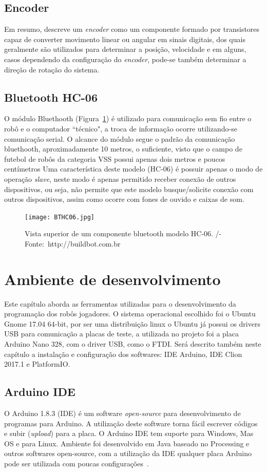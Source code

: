 \documentclass[a4paper,12pt,portuguese]{ufms-cpcx}
\begin{document}
\section{Encoder}\label{encoder}
Em resumo,  descreve um \textit{encoder} como um componente formado por transistores capaz de converter movimento linear ou angular em sinais digitais, dos quais geralmente são utilizados para determinar a posição, velocidade e em alguns, casos dependendo da configuração do \textit{encoder}, pode-se também determinar a direção de rotação do sistema. 

\section{Bluetooth HC-06}\label{bthc06}
O módulo Bluethooth (Figura~\ref{fig:BTHC06}) é utilizado para comunicação sem fio entre o robô e o computador ``técnico", a troca de informação ocorre utilizando-se comunicação serial. O alcance do módulo segue o padrão da comunicação bluethooth, aproximadamente 10 metros, o suficiente, visto que o campo de futebol de robôs da categoria VSS possui apenas dois metros e poucos centímetros Uma característica deste modelo (HC-06) é possuir apenas o modo de operação \textit{slave}, neste modo é apenas permitido receber conexão de outros dispositivos, ou seja, não permite que este modelo busque/solicite conexão com outros dispositivos, assim como ocorre com fones de ouvido e caixas de som.
\begin{figure}[H]	
	\centering
	\texttt{[image: BTHC06.jpg]}
	\caption{Vista superior de um componente bluetooth modelo HC-06. /-Fonte:~http://buildbot.com.br}
	\label{fig:BTHC06}
\end{figure}

\chapter{Ambiente de desenvolvimento}
Este capítulo aborda as ferramentas utilizadas para o desenvolvimento da programação dos robôs jogadores. O sistema operacional escolhido foi o Ubuntu Gnome 17.04 64-bit, por ser uma distribuição linux o Ubuntu já possui os drivers USB para comunicação a placas de teste, a utilizada no projeto foi a placa Arduino Nano 328, com o driver USB, como o FTDI. Será descrito também neste capítulo a instalação e configuração dos softwares: IDE Arduino, IDE Clion 2017.1 e PlatformIO.

\section{Arduino IDE}\label{arduinoide}
O Arduino 1.8.3 (IDE) é um software \textit{open-source} para desenvolvimento de programas para Arduino. A utilização deste software torna fácil escrever códigos e subir (\textit{upload}) para a placa. O Arduino IDE tem suporte para Windows, Mas OS e para Linux. Ambiente foi desenvolvido em Java baseado no Processing e outros softwares open-source, com a utilização da IDE qualquer placa Arduino pode ser utilizada com poucas configurações~\cite{sitearduinoide}.
\end{document}
